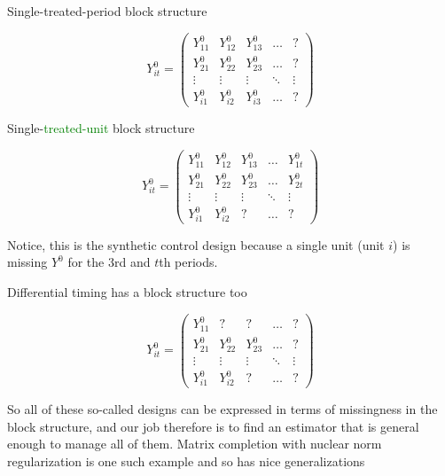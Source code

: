 \documentclass{beamer}
\begin{document}
\begin{frame}{Single-treated-period block structure}

\begin{center}
\[ Y^0_{it}  =\begin{pmatrix}
    Y^0_{11} & Y^0_{12} & Y^0_{13} & \dots  & ? \\
    Y^0_{21} & Y^0_{22} & Y^0_{23} & \dots  & ? \\
    \vdots & \vdots & \vdots & \ddots & \vdots \\
    Y^0_{i1} & Y^0_{i2} & Y^0_{i3} & \dots  & ?
\end{pmatrix}\]
\end{center}

\end{frame}


\begin{frame}{Single-\textcolor{green}{treated-unit} block structure}

\begin{center}
\[ Y^0_{it}  =\begin{pmatrix}
    Y^0_{11} & Y^0_{12} & Y^0_{13} & \dots  & Y^0_{1t} \\
    Y^0_{21} & Y^0_{22} & Y^0_{23} & \dots  & Y^0_{2t}  \\
    \vdots & \vdots & \vdots & \ddots & \vdots \\
    Y^0_{i1} & Y^0_{i2} & ? & \dots  & ?
\end{pmatrix}\]
\end{center}

Notice, this is the synthetic control design because a single unit (unit $i$) is missing $Y^0$ for the 3rd and $t$th periods.

\end{frame}

\begin{frame}{Differential timing has a block structure too}

\begin{center}
\[ Y^0_{it}  =\begin{pmatrix}
    Y^0_{11} & ? & ? & \dots  & ? \\
    Y^0_{21} & Y^0_{22} & Y^0_{23} & \dots  & ? \\
    \vdots & \vdots & \vdots & \ddots & \vdots \\
    Y^0_{i1} & Y^0_{i2} & ? & \dots  & ?
\end{pmatrix}\]
\end{center}

So all of these so-called designs can be expressed in terms of missingness in the block structure, and our job therefore is to find an estimator that is general enough to manage all of them.  Matrix completion with nuclear norm regularization is one such example and so has nice generalizations

\end{frame}
\end{document}
